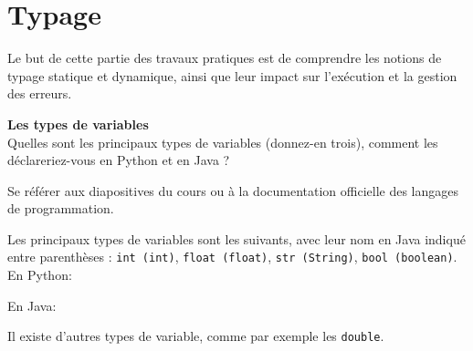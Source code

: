 \section{Typage}

Le but de cette partie des travaux pratiques est de comprendre les notions de typage statique et dynamique, ainsi que leur impact sur l’exécution et la gestion des erreurs. \\

\begin{Exercice}[5 minutes]  \textbf{Les types de variables}\\
    
    Quelles sont les principaux types de variables (donnez-en trois), comment les déclareriez-vous en Python et en Java ? \\

    \begin{conseil}
    
        Se référer aux diapositives du cours ou à la documentation officielle des langages de programmation.
        
    \end{conseil}
    \begin{solution}
    
       Les principaux types de variables sont les suivants, avec leur nom en Java indiqué entre parenthèses : \lstinline{int (int)}, \lstinline{float (float)}, \lstinline{str (String)}, \lstinline{bool (boolean)}.\\

		En Python:    
        
    
    	
    	
    	En Java: 
    	
    
    	
    	Il existe d'autres types de variable, comme par exemple les \lstinline{double}.
 
    \end{solution}
\end{Exercice}


